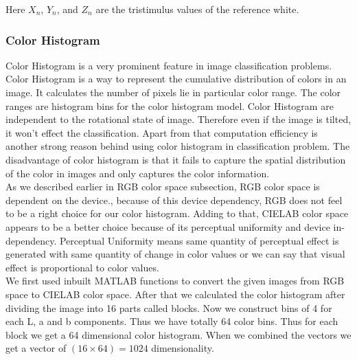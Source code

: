 	Here $X_n$, $Y_n$, and $Z_n$ are the tristimulus values of the reference white. 

\subsubsection*{Color Histogram}

Color Histogram is a very prominent feature in image classification problems. Color Histogram is a way to represent the cumulative distribution of colors in an image. It calculates the number of pixels lie in particular color range. The color ranges are histogram bins for the color histogram model. Color Histogram are independent to the rotational state of image. Therefore even if the image is tilted, it won't effect the classification. Apart from that computation efficiency is another strong reason behind using color histogram in classification problem. The disadvantage of color histogram is that it fails to capture the spatial distribution of the color in images and only captures the color information. \\
   As we described earlier in RGB color space subsection, RGB color space is dependent on the device., because of this device dependency,  RGB does not feel to be a right choice for our color histogram. Adding to that, CIELAB color space appears to be a better choice because of its perceptual uniformity and device in-dependency. Perceptual Uniformity means same quantity of perceptual effect is generated with same quantity of change in color values or we can say that visual effect is proportional to color values.\\
   We first used inbuilt MATLAB functions to convert the given images from RGB space to CIELAB color space. After that we  calculated the color histogram after dividing the image into 16 parts called blocks. Now we construct bins of 4 for each L,  a and b components. Thus we have totally 64 color bins. Thus for each block we get a 64 dimensional color histogram. When we combined the vectors we get a vector of $(16 \times 64 ) =1024$ dimensionality.
   
